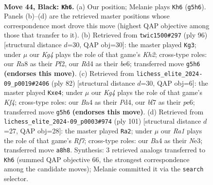 \documentclass[11pt]{article}
\begin{document}
\clearpage

\begin{figure}[p]\centering
\begin{subfigure}{0.46\textwidth}\centering
\resizebox{\linewidth}{!}{%
\newchessgame
\chessboard[
  setfen={r7/1p3B2/p7/4P1kp/bP1r4/P6K/5R2/R7 b - - 2 44},
  showmover=false,
  pgfstyle=straightmove, color=movearrow, markmove={g5-h6}
]}
\caption{}
\end{subfigure}\hfill
\begin{subfigure}{0.46\textwidth}\centering
\resizebox{\linewidth}{!}{%
\newchessgame
\chessboard[
  setfen={5k2/2R3p1/4bpBp/8/6P1/7P/5P1K/3r4 w - - 2 49},
  showmover=false,
  pgfstyle=straightmove, color=movearrow, markmove={h2-g3}
]}
\caption{}
\end{subfigure}
\\[4pt]
\begin{subfigure}{0.46\textwidth}\centering
\resizebox{\linewidth}{!}{%
\newchessgame
\chessboard[
  setfen={8/pp2r3/4p1k1/6P1/3PpK2/1P6/P1R5/8 w - - 0 42},
  showmover=false,
  pgfstyle=straightmove, color=movearrow, markmove={f4-e4}
]}
\caption{}
\end{subfigure}\hfill
\begin{subfigure}{0.46\textwidth}\centering
\resizebox{\linewidth}{!}{%
\newchessgame
\chessboard[
  setfen={8/p2R4/5ppk/1P6/7P/3Bn1P1/5r2/7K b - - 16 51},
  showmover=false,
  pgfstyle=straightmove, color=movearrow, markmove={f2-a2}
]}
\caption{}
\end{subfigure}
\caption{\textbf{Move 44, Black: \texttt{Kh6}.} (a) Our position; Melanie plays \texttt{Kh6} (\texttt{g5h6}). Panels (b)--(d) are the retrieved master positions whose correspondence most drove this move (highest QAP objective among those that transfer to it). (b) Retrieved from \texttt{twic1500\#297} (ply 96) [structural distance $d$=30, QAP obj=30]: the master played \texttt{Kg3}; under $\mu$ our \emph{Kg4} plays the role of that game's \emph{Kh2}; cross-type roles: our \emph{R}a8 as their \emph{P}f2, our \emph{R}d4 as their \emph{b}e6; transferred move \texttt{g5h6} \textbf{(endorses this move)}. (c) Retrieved from \texttt{lichess\_elite\_2024-09\_p0019\#2406} (ply 82) [structural distance $d$=30, QAP obj=6]: the master played \texttt{Kxe4}; under $\mu$ our \emph{Kg4} plays the role of that game's \emph{Kf4}; cross-type roles: our \emph{B}a4 as their \emph{P}d4, our \emph{b}f7 as their \emph{p}e6; transferred move \texttt{g5h6} \textbf{(endorses this move)}. (d) Retrieved from \texttt{lichess\_elite\_2024-09\_p0003\#974} (ply 101) [structural distance $d$=27, QAP obj=28]: the master played \texttt{Ra2}; under $\mu$ our \emph{Ra1} plays the role of that game's \emph{Rf7}; cross-type roles: our \emph{B}a4 as their \emph{N}e3; transferred move \texttt{a8h8}. Synthesis: 3 retrieved analogs transferred to \texttt{Kh6} (summed QAP objective 66, the strongest correspondence among the candidate moves); Melanie committed it via the \texttt{search} selector.}
\label{fig:thought-m87}
\end{figure}
\end{document}
